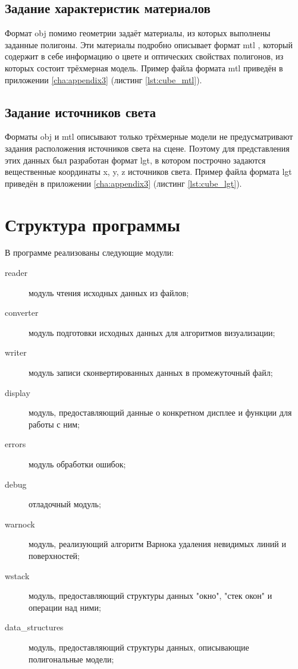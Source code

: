 \subsection{Задание характеристик материалов}
Формат obj помимо геометрии задаёт материалы, из которых выполнены заданные полигоны. Эти материалы подробно описывает формат 
mtl \cite{mtl}, который содержит в себе информацию о цвете и оптических свойствах полигонов, из которых состоит трёхмерная модель. 
Пример файла формата mtl приведён в приложении \ref{cha:appendix3} (листинг \ref{lst:cube_mtl}).

\subsection{Задание источников света}
Форматы obj и mtl описывают только трёхмерные модели не предусматривают задания расположения источников света на сцене. Поэтому 
для представления этих данных был разработан формат lgt, в котором построчно задаются вещественные координаты x, y, z источников света. 
Пример файла формата lgt приведён в приложении \ref{cha:appendix3} (листинг \ref{lst:cube_lgt}).



\section{Структура программы}
В программе реализованы следующие модули:
\begin{description}
	\item[reader] модуль чтения исходных данных из файлов;
	\item[converter] модуль подготовки исходных данных для алгоритмов визуализации;
	\item[writer] модуль записи сконвертированных данных в промежуточный файл;
	\item[display] модуль, предоставляющий данные о конкретном дисплее и функции для работы с ним;
	\item[errors] модуль обработки ошибок;
	\item[debug] отладочный модуль;
	\item[warnock] модуль, реализующий алгоритм Варнока удаления невидимых линий и поверхностей;
	\item[wstack] модуль, предоставляющий структуры данных "окно"{}, "стек окон" и операции над ними;
	\item[data\_structures] модуль, предоставляющий структуры данных, описывающие полигональные модели;
\end{description}

